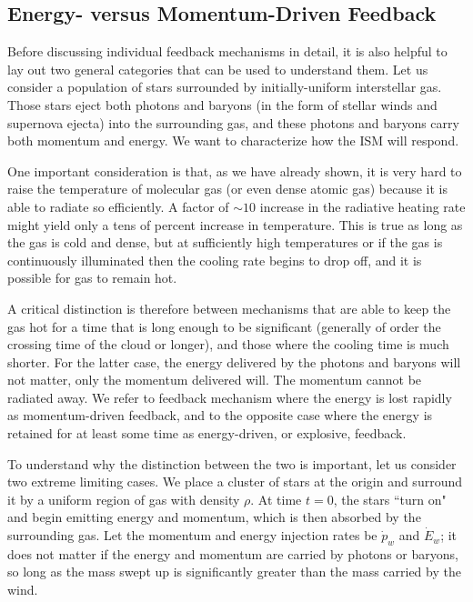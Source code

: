 \subsection{Energy- versus Momentum-Driven Feedback}

Before discussing individual feedback mechanisms in detail, it is also helpful to lay out two general categories that can be used to understand them. Let us consider a population of stars surrounded by initially-uniform interstellar gas. Those stars eject both photons and baryons (in the form of stellar winds and supernova ejecta) into the surrounding gas, and these photons and baryons carry both momentum and energy. We want to characterize how the ISM will respond.

One important consideration is that, as we have already shown, it is very hard to raise the temperature of molecular gas (or even dense atomic gas) because it is able to radiate so efficiently. A factor of $\sim 10$ increase in the radiative heating rate might yield only a tens of percent increase in temperature. This is true as long as the gas is cold and dense, but at sufficiently high temperatures or if the gas is continuously illuminated then the cooling rate begins to drop off, and it is possible for gas to remain hot.

A critical distinction is therefore between mechanisms that are able to keep the gas hot for a time that is long enough to be significant (generally of order the crossing time of the cloud or longer), and those where the cooling time is much shorter. For the latter case, the energy delivered by the photons and baryons will not matter, only the momentum delivered will. The momentum cannot be radiated away. We refer to feedback mechanism where the energy is lost rapidly as momentum-driven feedback, and to the opposite case where the energy is retained for at least some time as energy-driven, or explosive, feedback.

To understand why the distinction between the two is important, let us consider two extreme limiting cases. We place a cluster of stars at the origin and surround it by a uniform region of gas with density $\rho$. At time $t=0$, the stars ``turn on" and begin emitting energy and momentum, which is then absorbed by the surrounding gas. Let the momentum and energy injection rates be $\dot{p}_w$ and $\dot{E}_w$; it does not matter if the energy and momentum are carried by photons or baryons, so long as the mass swept up is significantly greater than the mass carried by the wind.

